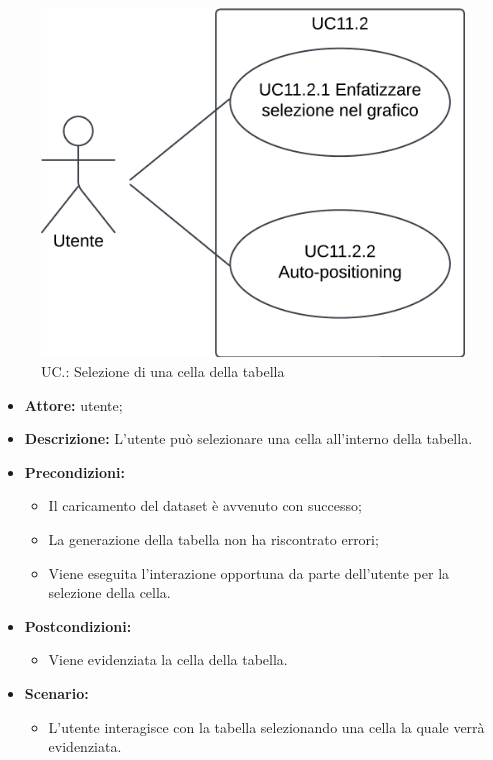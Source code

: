 \begin{figure}[h!]\centering
    \includegraphics[scale=0.7]{template/images/UC11.2.png}
    \caption{UC.: Selezione di una cella della tabella}
\end{figure}
\begin{itemize}    
    \item \textbf{Attore:} utente;
    \item \textbf{Descrizione:} L'utente può selezionare una cella all'interno della tabella.
    \item \textbf{Precondizioni:}    
        \begin{itemize}
            \item Il caricamento del dataset è avvenuto con successo;
            \item La generazione della tabella non ha riscontrato errori;
            \item Viene eseguita l'interazione opportuna da parte dell'utente per la selezione della cella.
        \end{itemize}    
    \item \textbf{Postcondizioni:}
        \begin{itemize}
            \item Viene evidenziata la cella della tabella.
        \end{itemize}    
    \item \textbf{Scenario:} 
        \begin{itemize}
            \item L'utente interagisce con la tabella selezionando una cella la quale verrà evidenziata.
        \end{itemize}
\end{itemize}
